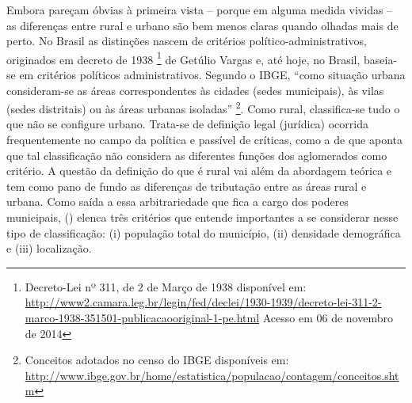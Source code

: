 Embora pareçam óbvias à primeira vista – porque em alguma medida vividas – as diferenças entre rural e urbano são bem menos claras quando olhadas mais de perto. No Brasil as distinções nascem de critérios político-administrativos, originados em decreto de 1938%
\footnote{Decreto-Lei nº 311, de 2 de Março de 1938 disponível em: \url{http://www2.camara.leg.br/legin/fed/declei/1930-1939/decreto-lei-311-2-marco-1938-351501-publicacaooriginal-1-pe.html} Acesso em 06 de novembro de 2014}
de Getúlio Vargas e, até hoje, no Brasil, baseia-se em critérios políticos administrativos. Segundo o IBGE, ``como situação urbana consideram-se as áreas correspondentes às cidades (sedes municipais), às vilas (sedes distritais) ou às áreas urbanas isoladas''%
\footnote{Conceitos adotados no censo do IBGE disponíveis em: \url{http://www.ibge.gov.br/home/estatistica/populacao/contagem/conceitos.shtm}}. Como rural, classifica-se tudo o que não se configure urbano. Trata-se de definição legal (jurídica) ocorrida frequentemente no campo da política e passível de críticas, como a de \cite{GRABOIS2001} que aponta que tal classificação não considera as diferentes funções dos aglomerados como critério. A questão da definição do que é rural vai além da abordagem teórica e tem como pano de fundo as diferenças de tributação entre as áreas rural e urbana. Como saída a essa arbitrariedade que fica a cargo dos poderes municipais,  (\citeyear{VEIGA2002}) elenca três critérios que entende importantes a se considerar nesse tipo de classificação: (i) população total do município, (ii) densidade demográfica e (iii) localização.

